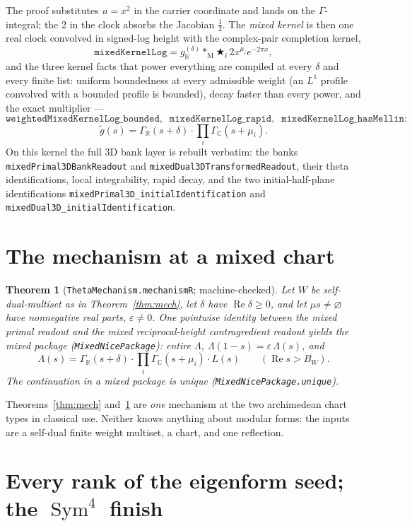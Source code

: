 \documentclass[11pt]{article}
\newtheorem{theorem}{Theorem}
\newcommand{\Sym}{\operatorname{Sym}}
\newcommand{\Gm}{\Gamma_{\mathbb C}}
\newcommand{\Gr}{\Gamma_{\mathbb R}}
\begin{document}
The proof substitutes $u=x^2$ in the carrier coordinate and lands on the
$\Gamma$-integral; the $2$ in the clock absorbs the Jacobian $\tfrac12$.
The \emph{mixed kernel} is then one real clock convolved in signed-log height with the
complex-pair completion kernel,
\[
\texttt{mixedKernelLog}
=g_{\mathbb R}^{(\delta)}\ast_{\mathrm M}\bigstar_i\,2x^{\mu_i}e^{-2\pi x},
\]
and the three kernel facts that power everything are compiled at every $\delta$ and
every finite list: uniform boundedness at every admissible weight (an $L^1$ profile
convolved with a bounded profile is bounded), decay faster than every power, and the
exact multiplier ---
\[
\texttt{weightedMixedKernelLog\_bounded},\;\;
\texttt{mixedKernelLog\_rapid},\;\;
\texttt{mixedKernelLog\_hasMellin}:
\]
\[
\widetilde{g}(s)=\Gr(s+\delta)\cdot\prod_i\Gm(s+\mu_i).
\]
On this kernel the full 3D bank layer is rebuilt verbatim: the banks
\texttt{mixedPrimal3DBankReadout} and \texttt{mixedDual3DTransformedReadout}, their
theta identifications, local integrability, rapid decay, and the two initial-half-plane
identifications \texttt{mixedPrimal3D\_initialIdentification} and
\texttt{mixedDual3D\_initialIdentification}.

\section{The mechanism at a mixed chart}

\begin{theorem}[\texttt{ThetaMechanism.mechanismR}; machine-checked]\label{thm:mechR}
Let $W$ be self-dual-multiset as in Theorem~\ref{thm:mech}, let $\delta$ have
$\operatorname{Re}\delta\ge0$, and let $\mu s\neq\varnothing$ have nonnegative real
parts, $\varepsilon\neq 0$.  One pointwise identity between the mixed primal readout
and the mixed reciprocal-height contragredient readout yields the mixed package
(\texttt{MixedNicePackage}): entire $\Lambda$,
$\Lambda(1-s)=\varepsilon\,\Lambda(s)$, and
\[
\Lambda(s)=\Gr(s+\delta)\cdot\prod_i\Gm(s+\mu_i)\cdot L(s)
\qquad(\operatorname{Re}s>B_W).
\]
The continuation in a mixed package is unique
(\texttt{MixedNicePackage.unique}).
\end{theorem}

Theorems~\ref{thm:mech} and~\ref{thm:mechR} are \emph{one} mechanism at the two
archimedean chart types in classical use.  Neither knows anything about modular forms:
the inputs are a self-dual finite weight multiset, a chart, and one reflection.

\section{Every rank of the eigenform seed; the $\Sym^4$ finish}
\end{document}
